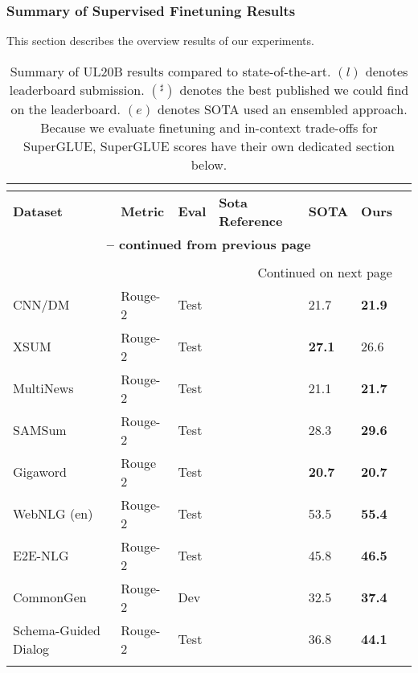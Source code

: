 \documentclass[10pt]{article}
\begin{document}
\subsubsection{Summary of Supervised Finetuning Results}
This section describes the overview results of our experiments.
\setlength{\LTcapwidth}{\linewidth}
\begin{center}
\small
\begin{longtable}{lllllll}


     \caption{Summary of UL20B results compared to state-of-the-art. $(l)$ denotes leaderboard submission. $(^\sharp)$ denotes the best published we could find on the leaderboard. $(e)$ denotes SOTA used an ensembled approach. Because we evaluate finetuning and in-context trade-offs for SuperGLUE, SuperGLUE scores have their own dedicated section below.} \\
         \label{tab:big_table} \\
\toprule
    \textbf{Dataset}     & \textbf{Metric} & \textbf{Eval} & \textbf{Sota Reference}  &  \textbf{SOTA} & \textbf{Ours} \\
    \midrule
    \endfirsthead
    
    \multicolumn{6}{c}{{\bfseries \tablename\ \thetable{} -- continued from previous page}} \\
\midrule \\
\endhead

\midrule \multicolumn{6}{r}{{Continued on next page}} \\
\endfoot

\bottomrule
\endlastfoot

       CNN/DM  & Rouge-2    & Test & \citeauthor{zoph2022designing}  &   21.7 & \textbf{21.9}    \\
    XSUM  & Rouge-2 & Test & \citeauthor{zoph2022designing} &\textbf{27.1} & 26.6 \\ 
    MultiNews & Rouge-2 & Test & \citeauthor{xiao2021primer}&21.1 & \textbf{21.7} \\
    SAMSum & Rouge-2 & Test & \citeauthor{narayan-etal-2021-planning}& 28.3 & \textbf{29.6} \\
    Gigaword & Rouge 2 & Test & \citeauthor{aghajanyan2020better} & \textbf{20.7} & \textbf{20.7} \\
    WebNLG (en) & Rouge-2 & Test & \citeauthor{bakshi2021structure} & 53.5 & \textbf{55.4}  \\ 
    E2E-NLG & Rouge-2 & Test & \citeauthor{xue2020mt5} & 45.8 & \textbf{46.5}\\
   CommonGen & Rouge-2 & Dev & \citeauthor{gehrmann2021gem}  & 32.5 & \textbf{37.4}\\
   Schema-Guided Dialog & Rouge-2 & Test & \citeauthor{gehrmann2021gem} & 36.8 & \textbf{44.1}\\
   \\
   

\end{longtable}
\end{center}
\end{document}
